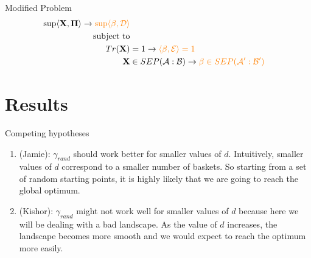\documentclass{beamer}
\begin{document}
        \begin{frame}{Modified Problem}
            \begin{align*}
                \sup\langle\mathbf{X}, \mathbf{\Pi}\rangle \rightarrow \textcolor{orange}{\sup\langle\mathbf{\beta}, \mathcal{D}\rangle} \\
                \mbox{subject to} \\
                Tr(\mathbf{X}) &= 1 \rightarrow \textcolor{orange}{\langle\mathbf{\beta}, \mathcal{E}\rangle = 1} \\
                \mathbf{X} &\in SEP(\mathcal{A}:\mathcal{B}) \rightarrow \textcolor{orange}{\mathbf{\beta} \in SEP(\mathcal{A}':\mathcal{B}')}
            \end{align*}
        \end{frame}

    \section{Results}
        \begin{frame}{Competing hypotheses}
            \begin{enumerate}
                \item (Jamie): $\gamma_{rand}$ should work better for smaller values of $d$. Intuitively, smaller values of $d$ correspond to a smaller number of baskets. So starting from a set of random starting points, it is highly likely that we are going to reach the global optimum.
                \item (Kishor): $\gamma_{rand}$ might not work well for smaller values of $d$ because here we will be dealing with a bad landscape. As the value of $d$ increases, the landscape becomes more smooth and we would expect to reach the optimum more easily.
            \end{enumerate}
        \end{frame}



    
\end{document}
